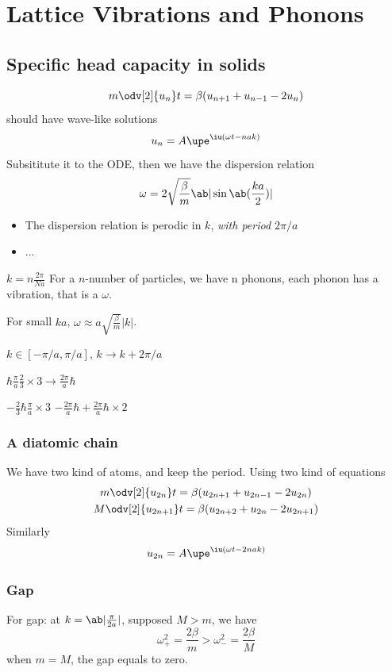 
\chapter{Lattice Vibrations and Phonons}

\section{Specific head capacity in solids}

\begin{equation}
  m \odv[2]{u_n}t = \beta(u_{n+1} + u_{n-1} - 2u_n)
\end{equation}
should have wave-like solutions
\[
  u_n = A\upe^{\iu(\omega t - nak)}
\]
Subsititute it to the ODE, then we have the dispersion relation
\[
  \omega = 2\sqrt{\frac\beta m} \ab|\sin\ab(\frac{ka}{2})|
\]
\begin{itemize}
  \item The dispersion relation is perodic in $k$, \emph{with period $2\pi/a$}
  \item ...
\end{itemize}

$k = n \frac{2\pi}{Na}$
For a $n$-number of particles, we have n phonons, each phonon has a vibration, that is a $\omega$.

For small $ka$, $\omega \approx a \sqrt{\frac\beta m}|k|$.

$k \in [-\pi/a, \pi/a]$, $k \to k + 2\pi/a$

$\hbar \frac\pi a \frac23 \times 3 \to \frac{2\pi}{a}\hbar$

$-\frac23\hbar\frac\pi a \times 3$ $-\frac{2\pi}{a}\hbar + \frac{2\pi}{a} \hbar \times 2$

\subsection{A diatomic chain}

We have two kind of atoms, and keep the period. Using two kind of equations
\begin{gather}
  m \odv[2]{u_{2n}}t = \beta(u_{2n+1} + u_{2n-1} - 2u_{2n})\\
  M \odv[2]{u_{2n+1}}t = \beta(u_{2n+2} + u_{2n} - 2u_{2n+1})
\end{gather}
Similarly
\[
  u_{2n} = A\upe^{\iu (\omega t - 2nak)}
\]

\subsection{Gap}

For gap: at $k = \ab|\frac\pi{2a}|$, supposed $M > m$, we have
\[
  \omega_+^2 = \frac{2\beta}m > \omega_-^2 = \frac{2\beta}{M}
\]
when $m = M$, the gap equals to zero.